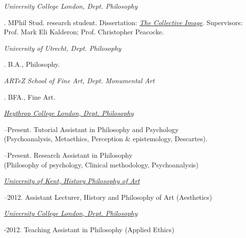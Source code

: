 \documentclass[11pt]{article}
\begin{document}
\noindent\emph{University College London, Dept. Philosophy \vspace{0.01in}}


. MPhil Stud. research student. Dissertation: \href{http://discovery.ucl.ac.uk/1348204/}{\emph{The Collective Image}}. Supervisors: Prof. Mark Eli Kalderon; Prof. Christopher Peacocke. \vspace{-0.1in}

\bigskip

\noindent\emph{University of Utrecht, Dept. Philosophy\vspace{0.02in}}

. B.A., Philosophy.

\medskip

\noindent\emph{ARTeZ School of Fine Art, Dept. Monumental Art\vspace{0.02in}}

. BFA., Fine Art.

\bigskip

\bigskip


\noindent\href{http://www.heythrop.ac.uk/departments/academic-departments/philosophy/}{\emph{Heythrop College London, Dept. Philosophy} \vspace{0.01in}}

--Present. Tutorial Assistant in Philosophy and Psychology\\ (Psychoanalysis, Metaethics, Perception \& epistemology, Descartes).

--Present. Research Assistant in Philosophy\\ (Philosophy of psychology, Clinical methodology, Psychoanalysis)

\medskip

\noindent\href{http://www.kent.ac.uk/arts/hpa/index.html}{\emph{University of Kent, History \amper Philosophy of Art} \vspace{0.01in}}

--2012. Assistant Lecturer, History and Philosophy of Art (Aesthetics)

\medskip

\noindent\href{http://www.ucl.ac.uk/philosophy/}{\emph{University College London, Dept. Philosophy}} \vspace{0.01in}

-2012. Teaching Assistant in Philosophy (Applied Ethics)
\end{document}
